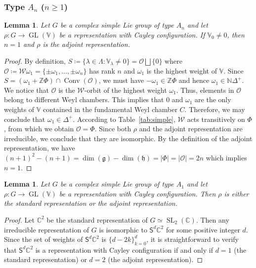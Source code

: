 \documentclass[11pt,reqno]{amsart}
\DeclareMathOperator{\GL}{GL}
\DeclareMathOperator{\Conv}{Conv}
\DeclareMathOperator{\SL}{SL}
\newtheorem{lemma}[theorem]{Lemma}
\newcommand{\W}{\mathcal{W}}
\begin{document}
\subsubsection{Type $A_n$ ($ n \ge 1$)}

\begin{lemma}\label{prop:adjoint}
Let $G$ be a complex simple Lie group of type $A_n$ and let $\rho: G \to \GL (\mathbb{V})$ be a representation with Cayley configuration.  If $\mathbb{V}_0 \ne 0$,  then $n = 1$ and $\rho$ is the adjoint representation.
\end{lemma}
\begin{proof}
By definition,  $S \coloneqq \{\lambda \in \Lambda: \mathbb{V}_{\lambda} \ne 0 \} = \mathcal{O} \bigsqcup \{0\}$ where $\mathcal{O} \coloneqq \W \omega_1 = \{\pm \omega_1,\dots,  \pm \omega_n\}$ has rank $n$ and $\omega_1$ is the highest weight of $\mathbb{V}$.  Since $S = (\omega_1 + \mathbb{Z} \Phi) \cap \Conv(\mathcal{O})$,  we must have $-\omega_1 \in \mathbb{Z} \Phi$ and hence $\omega_1 \in \mathbb{N} \Delta^+$.  We notice that $\mathcal{O}$ is the $\W$-orbit of the highest weight $\omega_1$.  Thus,  elements in $\mathcal{O}$ belong to different Weyl chambers.  This implies that $0$ and $\omega_1$ are the only weights of $\mathbb{V} $ contained in the fundamental Weyl chamber $C$.  Therefore,  we may conclude that $\omega_1 \in \Delta^+$.  According to Table~\ref{tab:simple},  $\W$ acts transitively on $\Phi$,  from which we obtain $\mathcal{O} = \Phi$.  Since both $\rho$ and the adjoint representation are irreducible,  we conclude that they are isomorphic.  By the definition of the adjoint representation,  we have $(n+1)^2 - (n+1) = \dim (\mathfrak{g}) - \dim (\mathfrak{h}) = |\Phi| = |\mathcal{O}| = 2n$ which implies $n = 1$.
\end{proof}

\begin{lemma}
Let $G$ be a complex simple Lie group of type $A_1$ and let $\rho: G \to \GL (\mathbb{V})$ be a representation with Cayley configuration.  Then $\rho$ is either the standard representation or the adjoint representation.
\end{lemma}
\begin{proof}
Let $\mathbb{C}^2$ be the standard representation of $G \simeq \SL_2(\mathbb{C})$.  Then any irreducible representation of $G$ is isomorphic to $\mathsf{S}^d \mathbb{C}^2$ for some positive integer $d$. Since the set of weights of $\mathsf{S}^d \mathbb{C}^2$ is $\{d - 2k\}_{k=0}^d$,  it is straightforward to verify that $\mathsf{S}^d \mathbb{C}^2$ is a representation with Cayley configuration if and only if $d = 1$ (the standard representation) or $d = 2$ (the adjoint representation). 
\end{proof}
    
\end{document}

